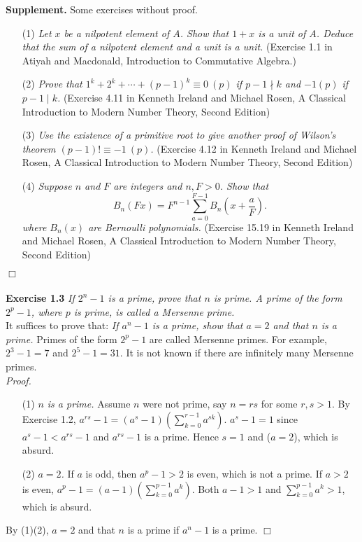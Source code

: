 \documentclass{article}
\begin{document}
\textbf{Supplement.} Some exercises without proof.
\begin{enumerate}
\item[(1)]
\emph{Let $x$ be a nilpotent element of $A$.
Show that $1+x$ is a unit of $A$.
Deduce that the sum of a nilpotent element and a unit is a unit.}
(Exercise 1.1 in Atiyah and Macdonald,
Introduction to Commutative Algebra.)

\item[(2)]
\emph{Prove that $1^k + 2^k + \cdots + (p-1)^k \equiv 0 \: (p)$
if $p - 1 \nmid k$ and $-1 (p)$ if $p - 1 \mid k$.}
(Exercise 4.11 in Kenneth Ireland and Michael Rosen,
A Classical Introduction to Modern Number Theory, Second Edition)

\item[(3)]
\emph{Use the existence of a primitive root to give another proof
of Wilson's theorem $(p - 1)! \equiv -1 \: (p)$.}
(Exercise 4.12 in Kenneth Ireland and Michael Rosen,
A Classical Introduction to Modern Number Theory, Second Edition)

\item[(4)]
\emph{Suppose $n$ and $F$ are integers and $n, F > 0$. Show that
$$B_n(Fx) = F^{n-1} \sum_{a=0}^{F-1} B_n \left(x + \frac{a}{F} \right).$$
where $B_n(x)$ are Bernoulli polynomials.}
(Exercise 15.19 in Kenneth Ireland and Michael Rosen,
A Classical Introduction to Modern Number Theory, Second Edition)
\end{enumerate}
$\Box$ \\\\



\textbf{Exercise 1.3}
\emph{If $2^n - 1$ is a prime, prove that $n$ is prime.
A prime of the form $2^p - 1$, where $p$ is prime, is called a Mersenne prime.} \\

It suffices to prove that:
\emph{If $a^n - 1$ is a prime, show that $a = 2$ and that $n$ is a prime.}
Primes of the form $2^p - 1$ are called Mersenne primes.
For example, $2^3 - 1 = 7$ and $2^5 - 1 = 31$.
It is not known if there are infinitely many Mersenne primes. \\

\emph{Proof.}
\begin{enumerate}
\item[(1)]
\emph{$n$ is a prime.}
Assume $n$ were not prime, say $n = rs$ for some $r, s > 1$.
By Exercise 1.2,
$a^{rs} - 1 = (a^s - 1)(\sum_{k=0}^{r-1} a^{sk})$.
$a^s - 1 = 1$ since $a^s - 1 < a^{rs} - 1$ and $a^{rs} - 1$ is a prime.
Hence $s=1$ and ($a=2$), which is absurd.
\item[(2)]
\emph{$a = 2$.}
If $a$ is odd, then $a^p - 1 > 2$ is even, which is not a prime.
If $a > 2$ is even,
$a^p - 1 = (a - 1)(\sum_{k=0}^{p-1} a^k)$.
Both $a - 1 > 1$ and $\sum_{k=0}^{p-1} a^k > 1$, which is absurd.
\end{enumerate}
By (1)(2), $a = 2$ and that $n$ is a prime if $a^n - 1$ is a prime.
$\Box$ \\\\
\end{document}
